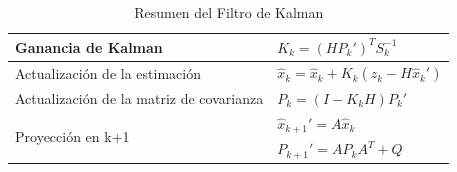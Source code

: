 \documentclass[10pt,a4paper]{article}
\begin{document}
\begin{table}[h!]
\begin{center}
\begin{tabular}{ll}
\hline
Ganancia de Kalman                                               & $K_k = \left(HP_k'\right)^TS_k^{-1}$                        \\ \hline
Actualizaci\'on de la estimaci\'on & $\hat{x}_k = \hat{x}_k + K_k\left(z_k - H\hat{x}_k'\right)$ \\ \hline
Actualizaci\'on de la matriz de covarianza        & $P_k = \left(I - K_k H\right)P_k'$                          \\ \hline
\multirow{2}{*}{Proyecci\'on en k+1}              & $\hat{x}_{k+1}' = A\hat{x}_k$                               \\ \cline{2-2} 
                                                                 & $P_{k+1}' = AP_kA^T + Q$                                    \\ \hline
\end{tabular}
\end{center}
\caption{Resumen del Filtro de Kalman}
\label{resumen_kalman_filter}
\end{table}




\newpage
\glsaddall
\printnoidxglossary[type=\acronymtype,title={Abreviaturas}]
\end{document}
